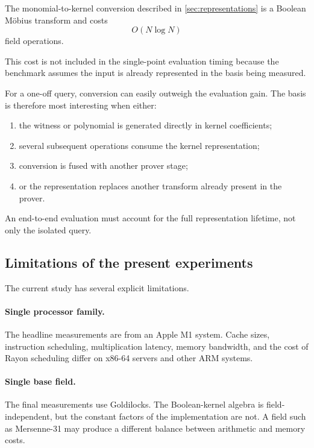 The monomial-to-kernel conversion described in
\cref{sec:representations} is a Boolean Möbius transform and costs
\[
O(N\log N)
\]
field operations.

This cost is not included in the single-point evaluation timing because
the benchmark assumes the input is already represented in the basis being
measured.

For a one-off query, conversion can easily outweigh the evaluation gain.
The basis is therefore most interesting when either:

\begin{enumerate}
    \item the witness or polynomial is generated directly in kernel
    coefficients;
    \item several subsequent operations consume the kernel representation;
    \item conversion is fused with another prover stage;
    \item or the representation replaces another transform already present
    in the prover.
\end{enumerate}

An end-to-end evaluation must account for the full representation lifetime,
not only the isolated query.

\subsection{Limitations of the present experiments}

The current study has several explicit limitations.

\paragraph{Single processor family.}
The headline measurements are from an Apple M1 system.  Cache sizes,
instruction scheduling, multiplication latency, memory bandwidth, and the
cost of Rayon scheduling differ on x86-64 servers and other ARM systems.

\paragraph{Single base field.}
The final measurements use Goldilocks.  The Boolean-kernel algebra is
field-independent, but the constant factors of the implementation are not.
A field such as Mersenne-31 may produce a different balance between
arithmetic and memory costs.

